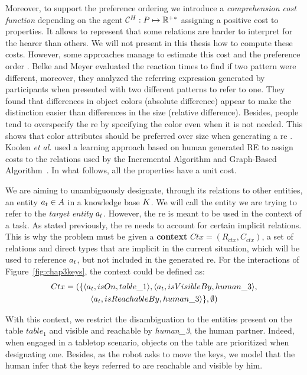 \documentclass[a4paper,11pt,twoside]{StyleThese}
\begin{document}
Moreover, to support the preference ordering we introduce a \textit{comprehension cost function} depending on the agent $\mathcal{C}^H: P \mapsto \mathbb{R}^{+*}$ assigning a positive cost to properties. It allows to represent that some relations are harder to interpret for the hearer than others. We will not present in this thesis how to compute these costs. However, some approaches manage to estimate this cost and the preference order \cite{belke2002tracking, koolen2012learning}. Belke and Meyer evaluated the reaction times to find if two pattern were different, moreover, they analyzed the referring expression generated by participants when presented with two different patterns to refer to one. They found that differences in object colors (absolute difference) appear to make the distinction easier than differences in the size (relative difference). Besides, people tend to overspecify the \acrfull{re} by specifying the color even when it is not needed. This shows that color attributes should be preferred over size when generating a \acrshort{re} \cite{belke2002tracking}. Koolen \textit{et al.} used a learning approach based on human generated RE to assign costs to the relations used by the Incremental Algorithm and Graph-Based Algorithm~\cite{koolen2012learning}. In what follows, all the properties have a unit cost.

We are aiming to unambiguously designate, through its relations to other entities, an entity $a_t \in A$ in a knowledge base $K$. We will call the entity we are trying to refer to the \textit{target entity} $a_t$.
However, the \acrshort{re} is meant to be used in the context of a task. As stated previously, the \acrshort{re} needs to account for certain implicit relations. This is why the problem must be given a \textbf{context} $Ctx = (R_{ctx}, C_{ctx})$, a set of relations and direct types that are implicit in the current situation, which will be used to reference $a_t$, but not included in the generated \acrshort{re}. For the interactions of Figure~\ref{fig:chap3keys}, the context could be defined as:
\begin{multline*}
Ctx = (\{ \langle a_t, isOn, table\_1 \rangle, \langle a_t, isVisibleBy, human\_3 \rangle,\\
\langle a_t, isReachableBy, human\_3 \rangle \}, \emptyset)
\end{multline*}

With this context, we restrict the disambiguation to the entities present on the table $table_1$ and visible and reachable by \textit{human\_3}, the human partner. Indeed, when engaged in a tabletop scenario, objects on the table are prioritized when designating one. Besides, as the robot asks to move the keys, we model that the human infer that the keys referred to are reachable and visible by him.
\end{document}
